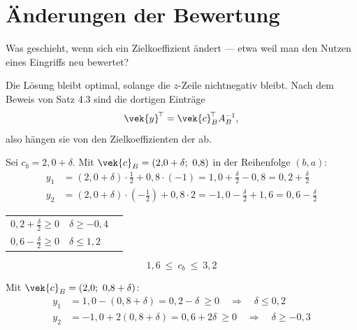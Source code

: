\section{Änderungen der Bewertung}

\begin{merksatz}
Was geschieht, wenn sich ein Zielkoeffizient ändert --- etwa weil man den Nutzen eines Eingriffs neu bewertet?

Die Lösung bleibt optimal, solange die $z$-Zeile nichtnegativ bleibt. Nach dem Beweis von Satz 4.3 sind die dortigen Einträge
\[ \vek{y}^{\!\top} = \vek{c}_B^{\!\top}A_B^{-1} , \]
also hängen sie von den Zielkoeffizienten der  ab.

Sei $c_b = 2{,}0+\delta$. Mit $\vek{c}_B = (2{,}0+\delta;\ 0{,}8)$ in der Reihenfolge $(b, a)$:
\begin{align*}
y_1 &= (2{,}0+\delta)\cdot\tfrac12 + 0{,}8\cdot(-1) = 1{,}0 + \tfrac{\delta}{2} - 0{,}8 = 0{,}2+\tfrac{\delta}{2}\\
y_2 &= (2{,}0+\delta)\cdot\left(-\tfrac12\right) + 0{,}8\cdot2 = -1{,}0-\tfrac{\delta}{2}+1{,}6 = 0{,}6-\tfrac{\delta}{2}
\end{align*}

\begin{center}
\renewcommand{\arraystretch}{1.5}
\begin{tabular}{@{}P{2.6cm}P{2.6cm}P{2.4cm}@{}}
\toprule
$0{,}2+\tfrac{\delta}{2} \ge 0$ & $\delta \ge -0{,}4$ & \\
$0{,}6-\tfrac{\delta}{2} \ge 0$ & $\delta \le 1{,}2$ & \\
\bottomrule
\end{tabular}
\end{center}

\[ \boxed{\ 1{,}6 \ \le\ c_b \ \le\ 3{,}2\ } \]

\begin{center}
\begin{minipage}{0.88\textwidth}
\end{minipage}
\end{center}

Mit $\vek{c}_B = (2{,}0;\ 0{,}8+\delta)$:
\begin{align*}
y_1 &= 1{,}0 - (0{,}8+\delta) = 0{,}2-\delta \ \ge 0 \quad\Longrightarrow\quad \delta \le 0{,}2\\
y_2 &= -1{,}0 + 2(0{,}8+\delta) = 0{,}6+2\delta \ \ge 0 \quad\Longrightarrow\quad \delta \ge -0{,}3
\end{align*}


\end{merksatz}
